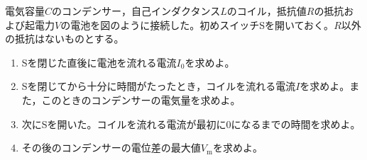 \item
    \begin{mawarikomi}{150pt}{
        
    }
電気容量$C$のコンデンサー，自己インダクタンス$L$のコイル，抵抗値$R$の抵抗および起電力$V$の電池を図のように接続した。初めスイッチSを開いておく。$R$以外の抵抗はないものとする。
        \begin{enumerate}
            \item Sを閉じた直後に電池を流れる電流$I_0$を求めよ。
            \item Sを閉じてから十分に時間がたったとき，コイルを流れる電流$I$を求めよ。また，このときのコンデンサーの電気量を求めよ。
            \item 次にSを開いた。コイルを流れる電流が最初に0になるまでの時間を求めよ。
            \item その後のコンデンサーの電位差の最大値$V_\mathrm{m}$を求めよ。
        \end{enumerate}
    \end{mawarikomi}
